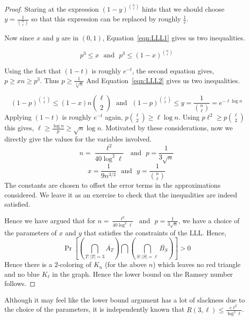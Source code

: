 \begin{proof}
Staring at the expression $(1-y)^{n \choose \ell}$ hints that we should choose $y=\frac{1}{{n \choose \ell}}$ so that this expression can be replaced by roughly $\frac{1}{e}$.

Now since $x$ and $y$ are in $(0,1)$, Equation~\ref{eqn:LLL1} gives us two inequalities.

$$p^3 \le x \textrm{~~and~~} p^3 \le (1-x)^{n \choose \ell}$$

Using the fact that $(1-t)$ is roughly $e^{-t}$, the second equation gives, $p \ge xn \ge p^3$. Thus $p \ge \frac{1}{\sqrt[3]{n}}$
And Equation~\ref{eqn:LLL2} gives us two inequalities.

$$(1-p)^{\ell \choose 2} \le (1-x){n{\ell \choose 2}}
\textrm{~~and~~}(1-p)^{\ell \choose 2} \le y = \frac{1}{{n \choose \ell}} = e^{-\ell\log n}
$$
Applying $(1-t)$ is roughly $e^{-t}$ again, $p{\ell \choose 2} \ge \ell \log n$. Using $p \ell^2 \ge p{\ell \choose 2}$ this gives, $\ell \ge \frac{\log n}{p} \ge \sqrt{n} \log n$. Motivated by these considerations, now we directly give the values for the variables involved.
$$n = \frac{\ell^2}{40\log^2 \ell} \textrm{~~and~~} p = \frac{1}{3\sqrt{n}}$$
$$x = \frac{1}{9n^{3/2}}\textrm{~~and~~}
y =  \frac{1}{{n \choose \ell}}$$
The constants are chosen to offset the error terms in the approximations considered. We leave it as an exercise to check that the inequalities are indeed satisfied.

Hence we have argued that for $n=\frac{\ell^2}{40\log^2 \ell} \textrm{~~and~~} p = \frac{1}{3\sqrt{n}}$, we have a choice of the parameters of $x$ and $y$ that satisfies the constraints of the LLL. Hence, 
$$\Pr\left[\left(\bigcap_{T:|T|=3} \overline{A_T} \right) \bigcap \left(\bigcap_{S:|S|=\ell} \overline{B_S}\right)\right] > 0$$
Hence there is a $2$-coloring of $K_n$ (for the above $n$) which leaves no red triangle and no blue $K_\ell$ in the graph. Hence the lower bound on the Ramsey number follows.
\end{proof}

\begin{remark}
Although it may feel like the lower bound argument has a lot of slackness due to the choice of the parameters, it is independently known that 
$R(3,\ell) \le \frac{c\ell^2}{\log^2 \ell}$.
\end{remark}